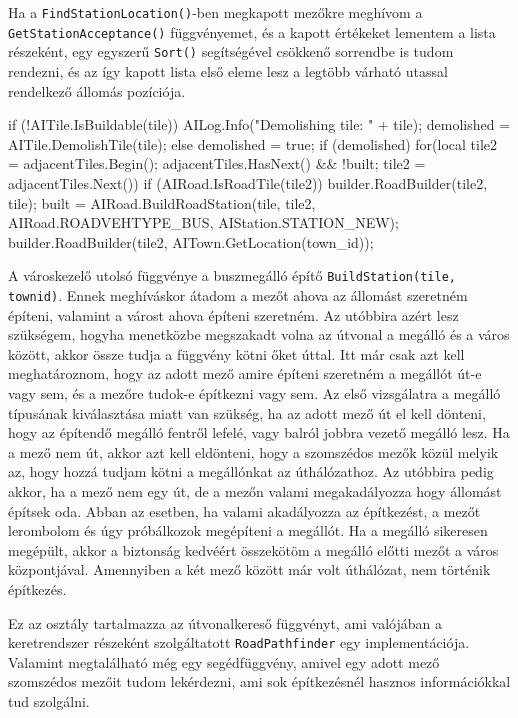 Ha a \texttt{FindStationLocation()}-ben megkapott mezőkre meghívom a \\ \texttt{GetStationAcceptance()} függvényemet, és a kapott értékeket lementem a lista részeként, egy egyszerű \texttt{Sort()} segítségével csökkenő sorrendbe is tudom rendezni, és az így kapott lista első eleme lesz a legtöbb várható utassal rendelkező állomás pozíciója.

\begin{cpp}
if (!AITile.IsBuildable(tile)) {
  AILog.Info("Demolishing tile: " + tile);
  demolished = AITile.DemolishTile(tile);
} else {
  demolished = true;
}
if (demolished) {
  for(local tile2 = adjacentTiles.Begin(); 
   adjacentTiles.HasNext() && !built; tile2 = adjacentTiles.Next()) {
	if (AIRoad.IsRoadTile(tile2)) {
      builder.RoadBuilder(tile2, tile);
      built = AIRoad.BuildRoadStation(tile, tile2,
      AIRoad.ROADVEHTYPE_BUS, AIStation.STATION_NEW);
      builder.RoadBuilder(tile2, AITown.GetLocation(town_id));
    }
  }
}
\end{cpp}

A városkezelő utolsó függvénye a buszmegálló építő \texttt{BuildStation(tile, townid)}. Ennek meghíváskor átadom a mezőt ahova az állomást szeretném építeni, valamint a várost ahova építeni szeretném. Az utóbbira azért lesz szükségem, hogyha menetközbe megszakadt volna az útvonal a megálló és a város között, akkor össze tudja a függvény kötni őket úttal. Itt már csak azt kell meghatároznom, hogy az adott mező amire építeni szeretném a megállót út-e vagy sem, és a mezőre tudok-e építkezni vagy sem. Az első vizsgálatra a megálló típusának kiválasztása miatt van szükség, ha az adott mező út el kell dönteni, hogy az építendő megálló fentről lefelé, vagy balról jobbra vezető megálló lesz. Ha a mező nem út, akkor azt kell eldönteni, hogy a szomszédos mezők közül melyik az, hogy hozzá tudjam kötni a megállónkat az úthálózathoz. Az utóbbira pedig akkor, ha a mező nem egy út, de a mezőn valami megakadályozza hogy állomást építsek oda. Abban az esetben, ha valami akadályozza az építkezést, a mezőt lerombolom és úgy próbálkozok megépíteni a megállót. Ha a megálló sikeresen megépült, akkor a biztonság kedvéért összekötöm a megálló előtti mezőt a város központjával. Amennyiben a két mező között már volt úthálózat, nem történik építkezés.


Ez az osztály tartalmazza az útvonalkereső függvényt, ami valójában a keretrendszer részeként szolgáltatott \texttt{RoadPathfinder} egy implementációja. Valamint megtalálható még egy segédfüggvény, amivel egy adott mező szomszédos mezőit tudom lekérdezni, ami sok építkezésnél hasznos információkkal tud szolgálni.

